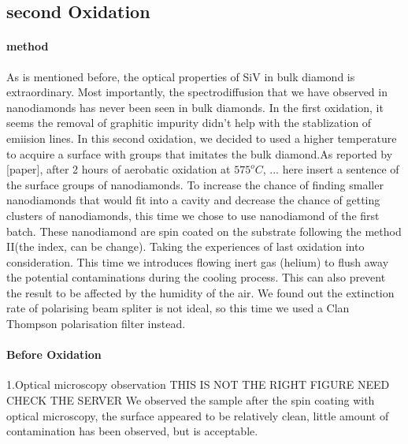 \subsection[Second Oxidation]{second Oxidation}

\paragraph{method} As is mentioned before, the optical properties of SiV in bulk diamond is extraordinary. Most importantly, the spectrodiffusion that we have observed in nanodiamonds has never been seen in bulk diamonds. In the first oxidation, it seems the removal of graphitic impurity didn't help with the stablization of emiision lines. In this second oxidation, we decided to used a higher temperature to acquire a surface with groups that imitates the bulk diamond.As reported by [paper], after 2 hours of aerobatic oxidation at $575^{o}C$, ... here insert a sentence of the surface groups of nanodiamonds. To increase the chance of finding smaller nanodiamonds that would fit into a cavity and decrease the chance of getting clusters of nanodiamonds, this time we chose to use nanodiamond of the first batch. These nanodiamond are spin coated on the substrate following the method II(the index, can be change).
Taking the experiences of last oxidation into consideration. This time we introduces flowing inert gas (helium) to flush away the potential contaminations during the cooling process. This can also prevent the result to be affected by the humidity of the air.
We found out the extinction rate of polarising beam spliter is not ideal, so this time we used a Clan Thompson polarisation filter instead.

\paragraph{Before Oxidation}
1.Optical microscopy observation
THIS IS NOT THE RIGHT FIGURE NEED CHECK THE SERVER
We observed the sample after the spin coating with optical microscopy, the surface appeared to be relatively clean, little amount of contamination has been observed, but is acceptable.

